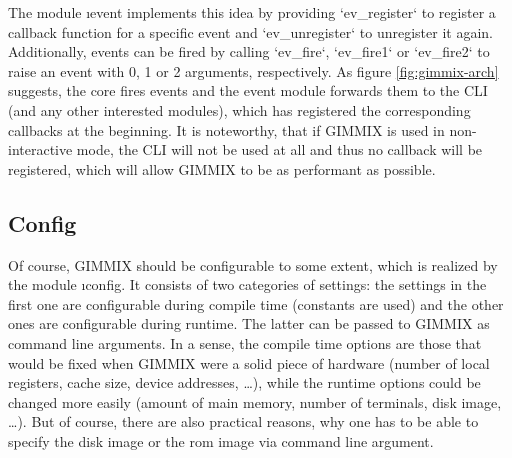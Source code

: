 The module \i{event} implements this idea by providing `ev_register` to register a callback function for a specific event and `ev_unregister` to unregister it again. Additionally, events can be fired by calling `ev_fire`, `ev_fire1` or `ev_fire2` to raise an event with 0, 1 or 2 arguments, respectively. As figure \ref{fig:gimmix-arch} suggests, the core fires events and the event module forwards them to the CLI (and any other interested modules), which has registered the corresponding callbacks at the beginning. It is noteworthy, that if GIMMIX is used in non-interactive mode, the CLI will not be used at all and thus no callback will be registered, which will allow GIMMIX to be as performant as possible.

\subsection{Config}

Of course, GIMMIX should be configurable to some extent, which is realized by the module \i{config}. It consists of two categories of settings: the settings in the first one are configurable during compile time (\ie constants are used) and the other ones are configurable during runtime. The latter can be passed to GIMMIX as command line arguments. In a sense, the compile time options are those that would be fixed when GIMMIX were a solid piece of hardware (number of local registers, cache size, device addresses, \dots), while the runtime options could be changed more easily (amount of main memory, number of terminals, disk image, \dots). But of course, there are also practical reasons, why one has to be able to specify the disk image or the rom image via command line argument.

